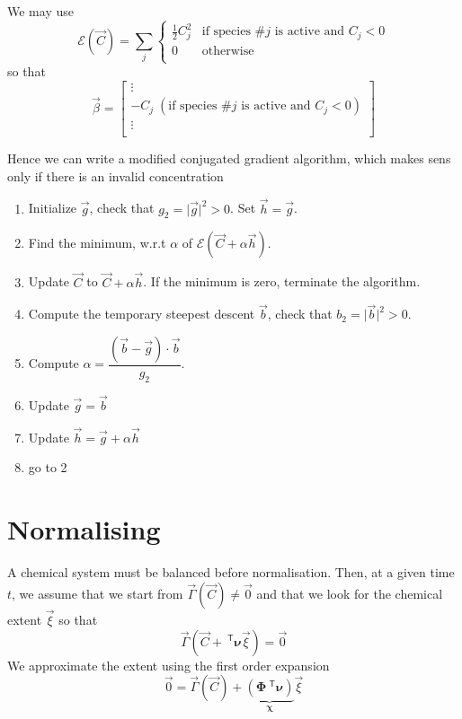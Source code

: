 \documentclass[aps]{revtex4}
\newcommand{\mymat}[1]{\bm{#1}}
\newcommand{\mytrn}[1]{~^{\mathsf{T}}{#1}}
\begin{document}
We may use
\begin{equation}
\mathcal{E}\left(\vec{C}\right) = \sum_{j} 
\left\lbrace
\begin{array}{ll}
\frac{1}{2} C_j^2 & \text{if species $\#j$ is  active  and $C_j<0$}  \\
0 & \text{otherwise}\\
\end{array}
\right. 
\end{equation}
so that
\begin{equation}
	\vec{\beta} =
	\begin{bmatrix}
	\vdots\\
	-C_j \; (\text{if species $\#j$ is  active  and $C_j<0$})\\
	\vdots\\
	\end{bmatrix}
\end{equation}

Hence we can write a modified conjugated gradient algorithm, which makes sens only if there is
an invalid concentration

\begin{enumerate}
\item Initialize $\vec{g}$, check that $g_2=\vert\vec{g}\vert^2>0$. Set $\vec{h}=\vec{g}$.
\item Find the minimum, w.r.t $\alpha$ of $\mathcal{E}\left(\vec{C}+\alpha \vec{h}\right)$. 
\item Update $\vec{C}$ to $\vec{C}+\alpha\vec{h}$. If the minimum is zero, terminate the algorithm.
\item Compute the temporary steepest descent $\vec{b}$, check that $b_2=\vert\vec{b}\vert^2>0$.
\item Compute $\alpha=\dfrac{\left(\vec{b}-\vec{g}\right)\cdot \vec{b}}{g_2}$.
\item Update $\vec{g} = \vec{b}$
\item Update $\vec{h} = \vec{g} + \alpha \vec{h}$
\item go to 2
\end{enumerate}

\section{Normalising}


A chemical system must be balanced before normalisation.
Then, at a given time $t$, we assume that we start from
$\vec{\Gamma}\left(\vec{C}\right)\not=\vec{0}$  and that we look for the chemical
extent $\vec{\xi}$ so that
\begin{equation}
	\vec{\Gamma}\left(\vec{C}+\mytrn{\mymat{\nu}}\vec{\xi}\right) = \vec{0}
\end{equation}
We approximate the extent using the first order expansion
\begin{equation}
	\vec{0} = \vec{\Gamma}\left(\vec{C}\right) + \underbrace{\left(\mymat{\Phi}\mytrn{\mymat{\nu}}\right)}_{\displaystyle \mymat{\chi}} 
	\vec{\xi}
\end{equation}	
\end{document}
